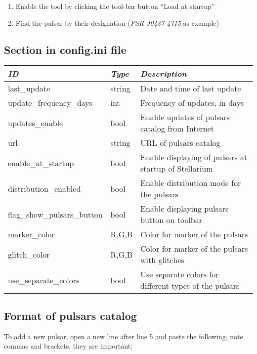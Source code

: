 \begin{enumerate}
\item Enable the tool by clicking the tool-bar button ``Load at startup''
\item Find the pulsar by their designation (\emph{PSR J0437-4715} as example)
\end{enumerate}

\subsection{Section  in config.ini file}
\label{sec:plugins:Pulsars:config}

\begin{longtabu} to \textwidth {l|l|X}\toprule
\emph{ID}               & \emph{Type} & \emph{Description}\\\midrule
last\_update                & string & Date and time of last update\\\midrule
update\_frequency\_days     & int    & Frequency of updates, in days\\\midrule
updates\_enable             & bool   & Enable updates of pulsars catalog from Internet \\\midrule
url                         & string & URL of pulsars catalog \\\midrule
enable\_at\_startup         & bool   & Enable displaying of pulsars at startup of Stellarium \\\midrule
distribution\_enabled       & bool   & Enable distribution mode for the pulsars \\\midrule
flag\_show\_pulsars\_button & bool   & Enable displaying pulsars button on toolbar \\\midrule
marker\_color               & R,G,B  & Color for marker of the pulsars \\\midrule
glitch\_color               & R,G,B  & Color for marker of the pulsars with glitches \\\midrule
use\_separate\_colors       & bool   & Use separate colors for different types of the pulsars \\\bottomrule
\end{longtabu}

\subsection{Format of pulsars catalog}
\label{sec:plugins:Pulsars:format}

To add a new pulsar, open a new line after line 5 and paste the following, note commas and brackets, they are important:

